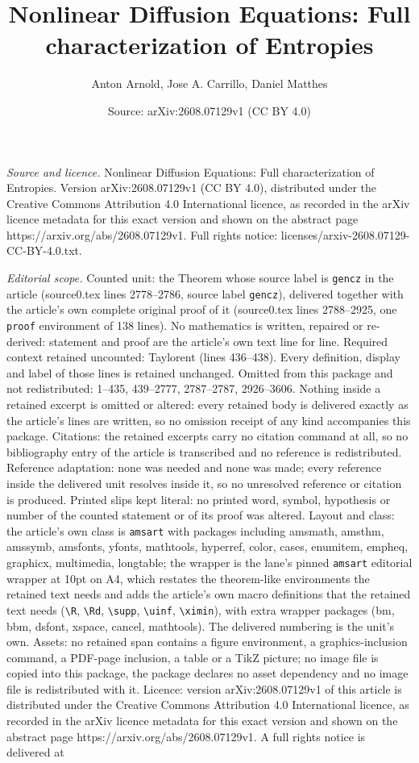 \documentclass[10pt,a4paper]{amsart}
\title[Nonlinear Diffusion Equations: Full characterization of Entr]{Nonlinear Diffusion Equations: Full characterization of Entropies}
\author{Anton Arnold, Jose A. Carrillo, Daniel Matthes}
\date{Source: arXiv:2608.07129v1 (CC BY 4.0)}
\begin{document}
\maketitle

\noindent\emph{Source and licence.} Nonlinear Diffusion Equations: Full characterization of Entropies. Version arXiv:2608.07129v1 (CC BY 4.0), distributed under the Creative Commons Attribution 4.0 International licence, as recorded in the arXiv licence metadata for this exact version and shown on the abstract page https://arxiv.org/abs/2608.07129v1. Full rights notice: licenses/arxiv-2608.07129-CC-BY-4.0.txt.\par\smallskip

\noindent\textit{Editorial scope.} Counted unit: the Theorem whose source label is \texttt{gencz} in the article (source0.tex lines 2778--2786, source label \texttt{gencz}), delivered together with the article's own complete original proof of it (source0.tex lines 2788--2925, one \texttt{proof} environment of 138 lines). No mathematics is written, repaired or re-derived: statement and proof are the article's own text line for line. Required context retained uncounted: Taylorent (lines 436--438). Every definition, display and label of those lines is retained unchanged. Omitted from this package and not redistributed: 1--435, 439--2777, 2787--2787, 2926--3606. Nothing inside a retained excerpt is omitted or altered: every retained body is delivered exactly as the article's lines are written, so no omission receipt of any kind accompanies this package. Citations: the retained excerpts carry no citation command at all, so no bibliography entry of the article is transcribed and no reference is redistributed. Reference adaptation: none was needed and none was made; every reference inside the delivered unit resolves inside it, so no unresolved reference or citation is produced. Printed slips kept literal: no printed word, symbol, hypothesis or number of the counted statement or of its proof was altered. Layout and class: the article's own class is \texttt{amsart} with packages including amsmath, amsthm, amssymb, amsfonts, yfonts, mathtools, hyperref, color, cases, enumitem, empheq, graphicx, multimedia, longtable; the wrapper is the lane's pinned \texttt{amsart} editorial wrapper at 10pt on A4, which restates the theorem-like environments the retained text needs and adds the article's own macro definitions that the retained text needs (\texttt{\textbackslash R}, \texttt{\textbackslash Rd}, \texttt{\textbackslash supp}, \texttt{\textbackslash uinf}, \texttt{\textbackslash ximin}), with extra wrapper packages (bm, bbm, dsfont, xspace, cancel, mathtools). The delivered numbering is the unit's own. Assets: no retained span contains a figure environment, a graphics-inclusion command, a PDF-page inclusion, a table or a TikZ picture; no image file is copied into this package, the package declares no asset dependency and no image file is redistributed with it. Licence: version arXiv:2608.07129v1 of this article is distributed under the Creative Commons Attribution 4.0 International licence, as recorded in the arXiv licence metadata for this exact version and shown on the abstract page https://arxiv.org/abs/2608.07129v1. A full rights notice is delivered at 
\end{document}
